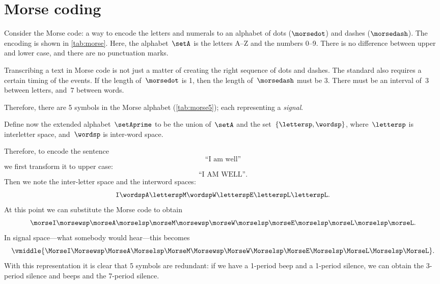 \section{Morse coding}

\begin{example}
    \label{exa:morse-code}
    Consider the Morse code: a way to encode the letters and numerals to an alphabet of dots ($\morsedot$) and dashes ($\morsedash$).
    The encoding is shown in \cref{tab:morse}.
    Here, the alphabet~$\setA$ is the letters A--Z and the numbers 0--9.
    There is no difference between upper and lower case, and there are no punctuation marks.

    Transcribing a text in Morse code is not just a matter of creating the right sequence of dots and dashes.
    The standard also requires a certain timing of the events.
    If the length of~$\morsedot$ is 1, then the length of~$\morsedash$ must be 3.
    There must be an interval of~$3$ between letters, and~$7$ between words.

    Therefore, there are 5 symbols in the Morse alphabet (\cref{tab:morse5}); each representing a \emph{signal}.

    Define now the extended alphabet~$\setAprime$ to be the union of~$\setA$ and the set~$\{\lettersp, \wordsp\}$, where~$\lettersp$ is interletter space, and~$\wordsp$ is inter-word space.

    Therefore, to encode the sentence
    \begin{equation*}
        \text{``I am well''}
    \end{equation*}
    we first transform it to upper case:
    \begin{equation*}
        \text{``I AM WELL''}.
    \end{equation*}
    Then we note the inter-letter space and the interword spaces:
    \begin{equation*}
        \texttt{I} \wordsp \texttt{A} \lettersp \texttt{M} \wordsp \texttt{W} \lettersp
        \texttt{E} \lettersp \texttt{L} \lettersp \texttt{L}.
    \end{equation*}
    At this point we can substitute the Morse code to obtain
    \begin{equation*}
        \morseI \morsewsp \morseA \morselsp \morseM \morsewsp \morseW \morselsp \morseE \morselsp \morseL \morselsp \morseL.
    \end{equation*}
    In signal space---what somebody would hear---this becomes
    \begin{equation*}
        \vmiddle{\MorseI \Morsewsp \MorseA \Morselsp \MorseM \Morsewsp \MorseW \Morselsp \MorseE \Morselsp \MorseL \Morselsp \MorseL}.
    \end{equation*}
    With this representation it is clear that 5 symbols are redundant: if we have a 1-period beep and a 1-period silence, we can obtain the 3-period silence and beeps and the 7-period silence.


\end{example}
